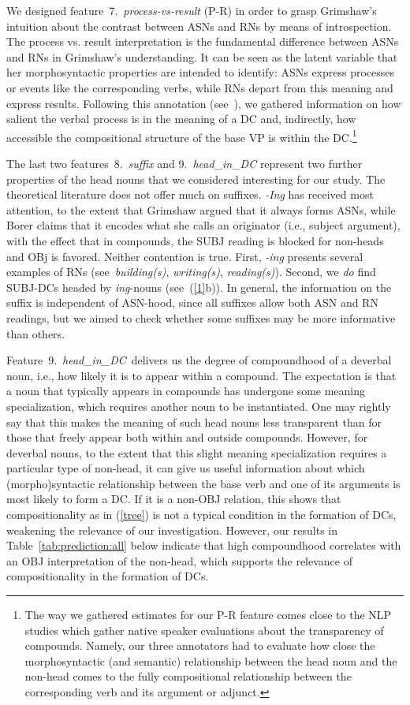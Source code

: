 \documentclass[output=paper]{langsci/langscibook}
\begin{document}
We designed feature~7.~\textit{process-vs-result} (P-R) in order to grasp Grimshaw's intuition about the contrast between ASNs and RNs by means of introspection. The process vs. result interpretation is  the fundamental difference between ASNs and RNs in Grimshaw's understanding.   It can be seen as the latent variable that her morphosyntactic properties are intended to identify: ASNs express processes or events like the corresponding verbs, while RNs depart from this meaning and express results. Following this annotation (see~), we gathered information on how salient the verbal process is in the meaning of a DC and, indirectly, how accessible the compositional structure of the base VP is within the DC.\footnote{The way we gathered estimates for our P-R feature comes close to the NLP studies which gather native speaker evaluations about the transparency of compounds. Namely, our three annotators had to evaluate how close the morphosyntactic (and semantic) relationship between the head noun and the non-head comes to the fully compositional relationship between the corresponding verb and its argument or adjunct.}


The last two features~8.~\textit{suffix} and 9.~\textit{head\_in\_DC} represent two further properties of the head nouns that we considered interesting for our study. The theoretical literature does not offer much on suffixes. \textit{-Ing} has received most attention, to the extent that Grimshaw argued that it always forms ASNs, while Borer claims that it encodes  {what she calls an} originator (i.e., subject argument), with the effect that in compounds, the SUBJ reading is blocked for non-heads and OBj is favored. Neither contention is true. First, \textit{-ing} presents several examples of RNs (see~\textit{building(s)}, \textit{writing(s)}, \textit{reading(s)}).
Second, we \textit{do} find SUBJ-DCs headed by \textit{ing}-nouns (see~(\ref{1}b)). In general, the information on the suffix is independent of ASN-hood, since all suffixes allow both ASN and RN readings, but we aimed to check whether some suffixes may be more informative than others. 


Feature~9.~\textit{head\_in\_DC}~delivers us the degree of compoundhood of a deverbal noun, i.e., how likely it is to appear within a compound.
The expectation is that a noun that typically appears in compounds has undergone some meaning specialization, which requires another noun to be instantiated. One may rightly say that this makes the meaning of such head nouns less transparent than for those that freely appear both within and outside compounds. However, for deverbal nouns, to the extent that this slight meaning specialization requires a particular type of non-head, it can give us useful information about which (morpho)syntactic relationship between the base verb and one of its arguments is most likely to form a DC. If it is a non-OBJ relation, this shows that compositionality as in (\ref{tree}) is not a typical condition in the formation of DCs, weakening the relevance of our investigation. However, our results 
in Table~\ref{tab:prediction:all} below indicate that high compoundhood correlates with an OBJ interpretation of the non-head, which supports the relevance of compositionality in the formation of DCs.
\end{document}
